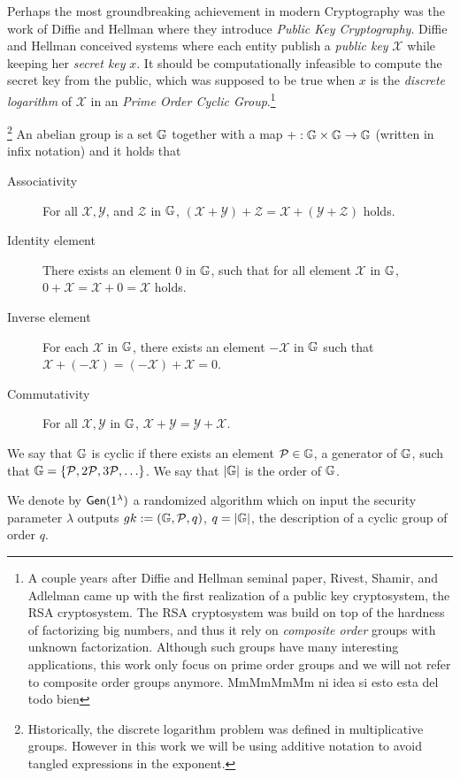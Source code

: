 Perhaps the most groundbreaking achievement in modern Cryptography was the work of Diffie and Hellman \cite{DifHel76} where they introduce \emph{Public Key Cryptography}. Diffie and Hellman conceived systems where each entity publish a \emph{public key} $\mathcal{X}$ while keeping her \emph{secret key} $x$.  It should be computationally infeasible to compute the secret key from the public, which was supposed to be true when $x$ is the \emph{discrete logarithm} of $\mathcal{X}$ in an \emph{Prime Order Cyclic Group}.\footnote{A couple years after Diffie and Hellman seminal paper,  Rivest, Shamir, and Adlelman came up with the first realization of a public key cryptosystem, the RSA cryptosystem. The RSA cryptosystem was build on top of the hardness of factorizing big numbers, and thus it rely on \emph{composite order} groups with unknown factorization. Although such groups have many interesting applications, this work only focus on prime order groups and we will not refer to composite order groups anymore.{\color{red} MmMmMmMm ni idea si esto esta del todo bien}}
\begin{definition}\footnote{Historically, the discrete logarithm problem was defined in multiplicative groups. However in this work we will be using additive notation to avoid tangled expressions in the exponent.} 
An abelian group is a set $\mathbb{G}$ together with a map $+:\mathbb{G}\times\mathbb{G}\to\mathbb{G}$ (written in infix notation) and  it holds that
\begin{description}
\item[Associativity]
For all $\mathcal{X}, \mathcal{Y}$, and $\mathcal{Z}$ in $\mathbb{G}$, $(\mathcal{X} + \mathcal{Y}) + \mathcal{Z}= \mathcal{X} + (\mathcal{Y} + \mathcal{Z})$ holds.
\item[Identity element]
There exists an element $0$ in $\mathbb{G}$, such that for all element $\mathcal{X}$ in $\mathbb{G}$, $0 + \mathcal{X} = \mathcal{X} + 0 = \mathcal{X}$ holds.
\item[Inverse element]
For each $\mathcal{X}$ in $\mathbb{G}$, there exists an element $-\mathcal{X}$ in $\mathbb{G}$ such that $\mathcal{X}+ (-\mathcal{X}) = (-\mathcal{X}) +\mathcal{X} = 0$.
\item[Commutativity]
For all $\mathcal{X}, \mathcal{Y}$ in $\mathbb{G}$, $\mathcal{X} + \mathcal{Y}=\mathcal{Y}+\mathcal{X}$.
\end{description}
We say that $\mathbb{G}$ is cyclic if there exists an element $\mathcal{P}\in\mathbb{G}$, a generator of $\mathbb{G}$, such that $\mathbb{G}=\{\mathcal{P}, 2\mathcal{P}, 3\mathcal{P},\ldots\}$. We say that $|\mathbb{G}|$ is the order of $\mathbb{G}$.

We denote by $\mathsf{Gen}(1^\lambda)$ a randomized algorithm which on input the security parameter $\lambda$ outputs $gk:=(\mathbb{G},\mathcal{P},q)$, $q=|\mathbb{G}|$, the description of a cyclic group of order $q$.
\end{definition}

